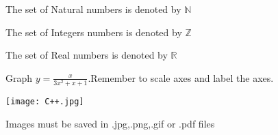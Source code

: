 \documentclass{article}
\def \eq1{y=\frac{x}{3x^2+x+1}}
\def \labelaxes{Remember to scale axes and label the axes}
\begin{document}
The set of Natural numbers is denoted by $\mathbb{N}$

The set of Integers numbers is denoted by $\mathbb{Z}$

The set of Real numbers is denoted by $\mathbb{R}$

Graph $\eq1$.\labelaxes.

\begin{center}

\texttt{[image: C++.jpg]}

Images must be saved in .jpg,.png,.gif or .pdf files

\end{center}
\end{document}

